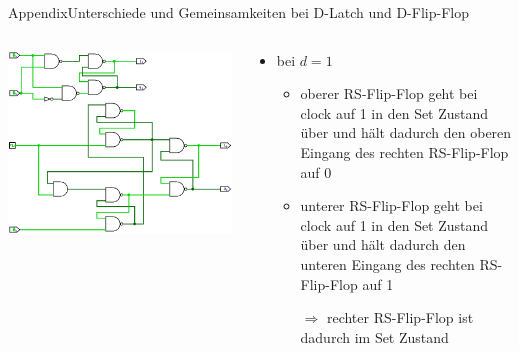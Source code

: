 \begin{frame}{Appendix}{Unterschiede und Gemeinsamkeiten bei D-Latch und D-Flip-Flop}
  \begin{columns}
    \begin{column}{0.4\textwidth}
      \includegraphics[width=0.6\paperheight, center]{./figures/111.png}
    \end{column}
    \begin{column}{0.6\textwidth}
      \begin{itemize}
        \item bei $d=1$
        \begin{itemize}
          \item \alert{oberer RS-Flip-Flop} geht bei \alert{clock} auf \alert{1} in den \alert{Set Zustand} über und hält dadurch den oberen Eingang des \alert{rechten RS-Flip-Flop} auf \alert{0}
          \item \alert{unterer RS-Flip-Flop} geht bei \alert{clock} auf \alert{1} in den \alert{Set Zustand} über und hält dadurch den unteren Eingang des \alert{rechten RS-Flip-Flop} auf \alert{1}
          \item[\textcolor{PrimaryColor}{$\Rightarrow$}] \alert{rechter RS-Flip-Flop} ist dadurch im \alert{Set Zustand}
        \end{itemize}
      \end{itemize}
    \end{column}
  \end{columns}
\end{frame}
